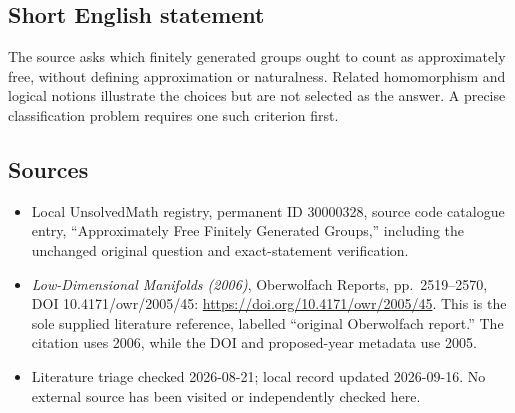 \documentclass[11pt]{article}
\begin{document}
\subsection{Short English statement}
The source asks which finitely generated groups ought to count as approximately free, without defining approximation or naturalness. Related homomorphism and logical notions illustrate the choices but are not selected as the answer. A precise classification problem requires one such criterion first.
\subsection{Sources}
\begin{itemize}
\item Local UnsolvedMath registry, permanent ID 30000328, source code catalogue entry, ``Approximately Free Finitely Generated Groups,'' including the unchanged original question and exact-statement verification.
\item \emph{Low-Dimensional Manifolds (2006)}, Oberwolfach Reports, pp.\ 2519--2570, DOI 10.4171/owr/2005/45: \url{https://doi.org/10.4171/owr/2005/45}. This is the sole supplied literature reference, labelled ``original Oberwolfach report.'' The citation uses 2006, while the DOI and proposed-year metadata use 2005.
\item Literature triage checked 2026-08-21; local record updated 2026-09-16. No external source has been visited or independently checked here.
\end{itemize}
\end{document}

